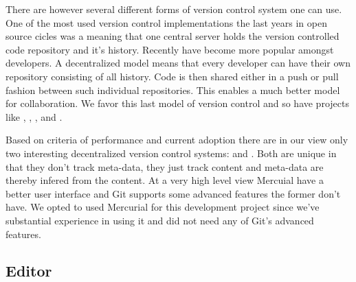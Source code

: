 There are however several different forms of version control system one can
use. One of the most used version control implementations the last years
in open source cicles was
%
\dash{}a  meaning that one central
server holds the version controlled code repository and it's history.%
Recently  have become more popular
amongst developers. A decentralized model means that every developer can have
their own repository consisting of all history.%
Code is then shared either in a push or pull fashion between such individual
repositories. This enables a much better model for collaboration.
We favor this last model of version control and so have projects
like , , ,
and .%

Based on criteria of performance and current adoption there are in our view
only two interesting decentralized version control systems:
%
and %
. Both are unique in that they don't track meta-data, they just track
content and meta-data are thereby infered from the content.
At a very high level view Mercuial have a better user interface and Git
supports some advanced features the former don't have. We opted to used
Mercurial for this development project since we've substantial experience in
using it and did not need any of Git's advanced features.

\subsection{Editor}

